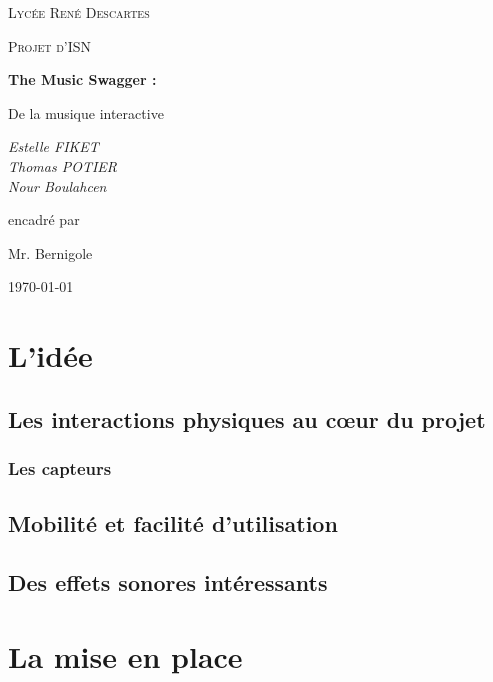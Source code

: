 \documentclass[12pt]{article}
\begin{document}
	\begin{titlepage}
		\centering
		{\scshape\LARGE Lycée René Descartes \par}
		\vspace{1cm}
		{\scshape\Large Projet d'ISN\par}
		\vspace{1.5cm}
		{\huge\bfseries The Music Swagger :\par De la musique interactive\par}
		\vspace{2cm}
		{\Large\itshape Estelle FIKET\\Thomas POTIER\\Nour Boulahcen\par}
		\vfill
		encadré par\par
		Mr. Bernigole
		
		\vfill
		
		{\large \today\par}
	\end{titlepage}
	\tableofcontents
	\newpage
	\section{L'idée}
	\subsection{Les interactions physiques au cœur du projet}
	\subsubsection{Les capteurs}
	\subsection{Mobilité et facilité d'utilisation}
	\subsection{Des effets sonores intéressants}
	\section{La mise en place}
\end{document}
